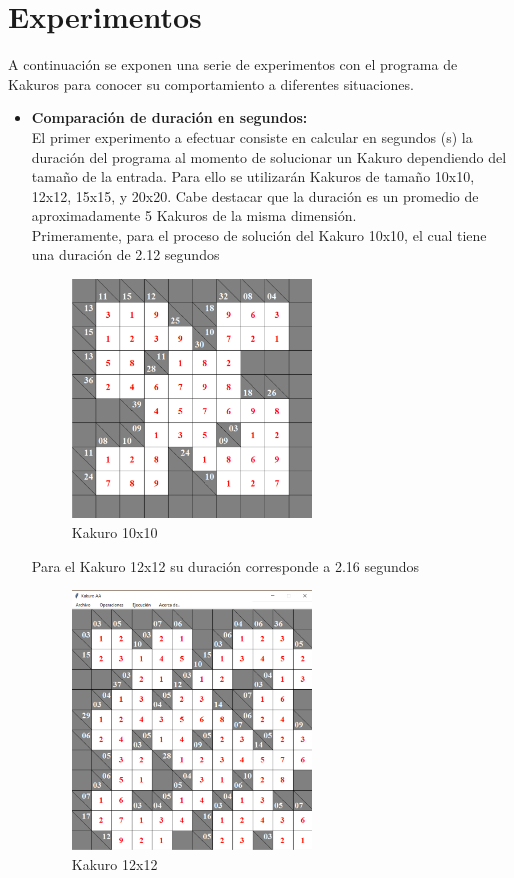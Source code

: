 \documentclass[journal]{IEEEtran}
\begin{document}
\section{Experimentos}
A continuación se exponen una serie de experimentos con el programa de Kakuros para conocer su comportamiento a diferentes situaciones. 
\begin{itemize}
	\item{\bf Comparación de duración en segundos:}  \\
	El primer experimento a efectuar consiste en calcular en segundos (s) la duración del programa al momento de solucionar un Kakuro dependiendo del tamaño de la entrada. Para ello se utilizarán Kakuros de tamaño 10x10, 12x12, 15x15, y 20x20. Cabe destacar que la duración es un promedio de aproximadamente 5 Kakuros de la misma dimensión.\\
	Primeramente, para el proceso de solución del Kakuro 10x10, el cual tiene una duración de  2.12 segundos
	
	\begin{figure}[h]
		\centering
		\includegraphics[width=180pt]{ExpKakuro10x10.png}
		\caption{Kakuro 10x10}
	\end{figure}
	
	Para el Kakuro 12x12 su duración corresponde a 2.16 segundos
	
	
	\begin{figure}[h]
		\centering
		\includegraphics[width=180pt]{ExpKakuro12x12.png}
		\caption{Kakuro 12x12}
	\end{figure}
	

\end{itemize}
\end{document}
